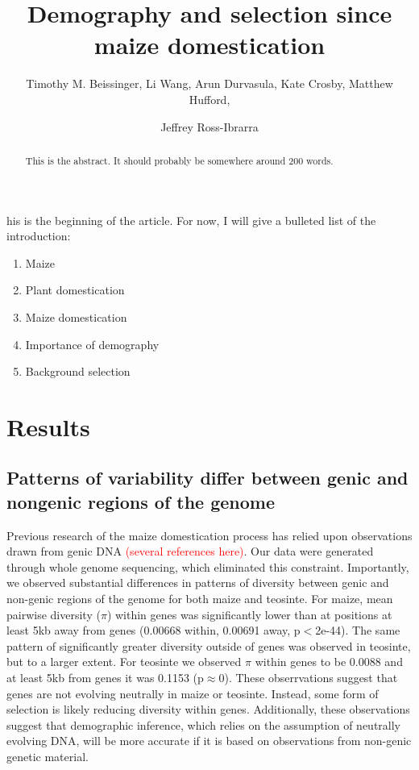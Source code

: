 \documentclass{pnastwo}
\begin{document}
\title{Demography and selection since maize domestication}
\author{Timothy M. Beissinger, Li Wang, Arun
  Durvasula, Kate Crosby, Matthew Hufford, \and Jeffrey
  Ross-Ibrarra }


\maketitle

\begin{article}

\begin{abstract}
This is the abstract. It should probably be somewhere around 200 words.
\end{abstract}

his is the beginning of the article. For now, I will give a
bulleted list of the introduction:
\begin{enumerate}
\item Maize
\item Plant domestication
\item Maize domestication
\item Importance of demography
\item Background selection
\end{enumerate}



\section{Results}
\subsection{Patterns of variability differ between genic and
  nongenic regions of the genome}
Previous research of the maize domestication process has relied upon
observations drawn from genic DNA \textcolor{red}{(several references
  here)}. Our data were generated through whole genome sequencing,
which eliminated this constraint. Importantly, we observed substantial
differences in patterns of diversity between genic and non-genic regions
of the genome for both maize and teosinte. For maize, mean pairwise
diversity ($\pi$) within genes was significantly lower than at
positions at least 5kb away from genes (0.00668 within, 0.00691 away, p$<$2e-44). The same
pattern of significantly greater diversity outside of genes was observed in
teosinte, but to a larger extent. For teosinte we observed $\pi$
within genes to be 0.0088 and at least 5kb from genes it was 0.1153
(p$\approx$0). These obserrvations suggest that genes are not evolving
neutrally in maize or teosinte. Instead, some form of selection is likely
reducing diversity within genes. Additionally, these observations
suggest that demographic inference, which relies on the assumption of
neutrally evolving DNA, will be more accurate if it is based on
observations from non-genic genetic material.


\end{article}
\end{document}
